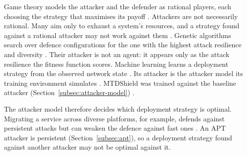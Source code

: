 \documentclass{cshonours}
\begin{document}
Game theory models the attacker and the defender as rational players, each
choosing the strategy that maximises its payoff \citep{cho2020}. Attackers
are not necessarily rational. Many aim only to exhaust a system's
resources, and a strategy found against a rational attacker may not work
against them \citep{cho2020}. Genetic algorithms search over defence
configurations for the one with the highest attack resilience and
diversity \citep{cho2020}. Their attacker is not an agent: it appears only
as the attack resilience the fitness function scores. Machine learning
learns a deployment strategy from the observed network state
\citep{cho2020}. Its attacker is the attacker model its training
environment simulates \citep{tay2024, ho2024}. MTDShield was trained against the baseline
attacker (Section~\ref{subsec:attacker-model}) \citep{tay2024}.

The attacker model therefore decides which deployment strategy is optimal.
Migrating a service across diverse platforms, for example, defends against
persistent attacks but can weaken the defence against fast ones
\citep{cho2020}. An APT attacker is persistent
(Section~\ref{subsec:apt}), so a deployment strategy found against another
attacker may not be optimal against it.
\end{document}
